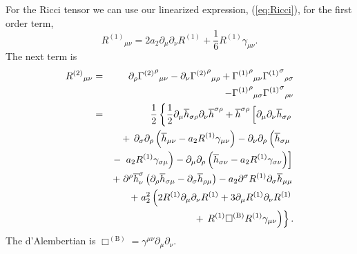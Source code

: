 \documentclass[aps,prd,amsfonts,amssymb,amsmath,nofootinbib,reprint,showpacs]{revtex4-1}
\newcommand{\eqnref}[1]{(\ref{eq:#1})}
\newcommand{\recip}[1]{\ensuremath{\frac{1}{#1}}}
\begin{document}
For the Ricci tensor we can use our linearized expression, \eqnref{Ricci}, for the first order term,
\begin{equation}
{R^{(1)}}_{\mu\nu} = 2 a_2\partial_\mu\partial_\nu R^{(1)} + \recip{6} R^{(1)}\gamma_{\mu\nu}.
\end{equation}
The next term is
\begin{eqnarray}
{R^{(2)}}_{\mu\nu} & = & \partial_\rho {{\Gamma^{(2)}}^\rho}_{\mu\nu} - \partial_\nu {{\Gamma^{(2)}}^\rho}_{\mu\rho} + {{\Gamma^{(1)}}^\rho}_{\mu\nu}{{\Gamma^{(1)}}^\sigma}_{\rho\sigma} \nonumber \\* 
 & & - {} {{\Gamma^{(1)}}^\rho}_{\mu\sigma}{{\Gamma^{(1)}}^\sigma}_{\rho\nu} \nonumber \\
 & = & \frac{1}{2}\left\{\recip{2}\partial_\mu\overline{h}_{\sigma\rho}\partial_\nu\overline{h}^{\sigma\rho} + \overline{h}^{\sigma\rho}\left[\partial_\mu\partial_\nu\overline{h}_{\sigma\rho} \vphantom{R^{(1)}} \right.\right. \nonumber \\*
 & & + \left.\left. \partial_\sigma\partial_\rho\left(\overline{h}_{\mu\nu} - a_2 R^{(1)}\gamma_{\mu\nu}\right) - \partial_\nu\partial_\rho\left(\overline{h}_{\sigma\mu} \vphantom{R^{(1)}} \right.\right.\right. \nonumber \\*
 & & - \left.\left.\left. a_2 R^{(1)} \gamma_{\sigma\mu}\right) - \partial_\mu\partial_\rho\left(\overline{h}_{\sigma\nu} - a_2 R^{(1)} \gamma_{\sigma\nu}\right)\right] \right. \nonumber \\*
 & & + \left. \partial^\rho\overline{h}^\sigma_\nu\left(\partial_\rho\overline{h}_{\sigma\mu} - \partial_\sigma\overline{h}_{\rho\mu}\right) - a_2 \partial^\sigma R^{(1)}\partial_\sigma\overline{h}_{\mu\mu} \right. \nonumber \\*
 & & + \left. a_2^2 \left(2R^{(1)}\partial_\mu\partial_\nu R^{(1)} + 3\partial_\mu R^{(1)}\partial_\nu R^{(1)} \right.\right. \nonumber \\*
 & & + \left.\left. R^{(1)} \Box^{(\text{B})} R^{(1)} \gamma_{\mu\nu}\right)\right\}.
\end{eqnarray}
The d'Alembertian is $\Box^{(\text{B})} = \gamma^{\mu\nu}\partial_\mu\partial_\nu$.
\end{document}
